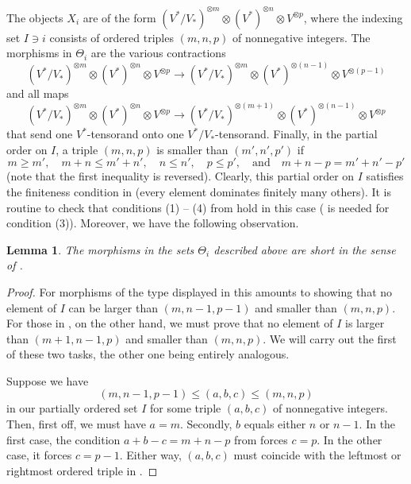 \documentclass[11pt]{article}
\theoremstyle{plain}
\newtheorem{lemma}{Lemma}[section]
\theoremstyle{nonumberplain}
\theoremstyle{plain}
\theoremstyle{nonumberplain}
\newtheorem{proof}{Proof}
\begin{document}
The objects $X_i$ are of the form $(V^*/V_*)^{\otimes m}\otimes (V^*)^{\otimes n}\otimes V^{\otimes p}$, where the indexing set $I\ni i$ consists of ordered triples $(m,n,p)$ of nonnegative integers. The morphisms in $\Theta_i$ are the various contractions 
\begin{equation}\label{eq:short1}
(V^*/V_*)^{\otimes m}\otimes (V^*)^{\otimes n}\otimes V^{\otimes p}\to (V^*/V_*)^{\otimes m}\otimes (V^*)^{\otimes (n-1)}\otimes V^{\otimes (p-1)}  
\end{equation}
and all maps
\begin{equation}\label{eq:short2}
(V^*/V_*)^{\otimes m}\otimes (V^*)^{\otimes n}\otimes V^{\otimes p}\to (V^*/V_*)^{\otimes (m+1)}\otimes (V^*)^{\otimes (n-1)}\otimes V^{\otimes p}  
\end{equation}
that send one $V^*$-tensorand onto one $V^*/V_*$-tensorand. Finally, in the partial order on $I$, a triple $(m,n,p)$ is smaller than $(m',n',p')$ if 
\begin{equation}\label{eq:order}
m\ge m',\quad m+n\le m'+n',\quad  n\le n',\quad p\le p',\quad \text{and}\quad m+n-p=m'+n'-p'   
\end{equation}
 (note that the first inequality is reversed). Clearly, this partial order on $I$ satisfies the finiteness condition in  (every element dominates finitely many others). It is routine to check that conditions (1) -- (4) from  hold in this case ( is needed for condition (3)). Moreover, we have the following observation. 


\begin{lemma}\label{le.short}
  The morphisms in the sets $\Theta_i$ described above are short in the sense of .
\end{lemma}
\begin{proof}
For morphisms of the type displayed in  this amounts to showing that no element of $I$ can be larger than $(m,n-1,p-1)$ and smaller than $(m,n,p)$. For those in , on the other hand, we must prove that no element of $I$ is larger than $(m+1,n-1,p)$ and smaller than $(m,n,p)$. We will carry out the first of these two tasks, the other one being entirely analogous. 

Suppose we have
\begin{equation}\label{eq:chain}
  (m,n-1,p-1)\le (a,b,c)\le (m,n,p)
\end{equation}
in our partially ordered set $I$ for some triple $(a,b,c)$ of nonnegative integers. Then, first off, we must have $a=m$. Secondly, $b$ equals either $n$ or $n-1$. In the first case, the condition $a+b-c=m+n-p$ from  forces $c=p$. In the other case, it forces $c=p-1$. Either way, $(a,b,c)$ must coincide with the leftmost or rightmost ordered triple in .  
\end{proof}
\end{document}
